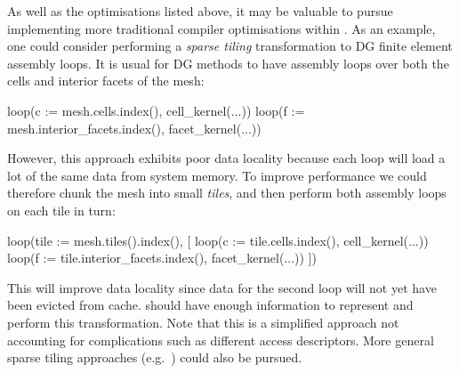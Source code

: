 \documentclass[thesis]{subfiles}
\begin{document}
As well as the optimisations listed above, it may be valuable to pursue implementing more traditional compiler optimisations within .
As an example, one could consider performing a \emph{sparse tiling} transformation to DG finite element assembly loops.
It is usual for DG methods to have assembly loops over both the cells and interior facets of the mesh:
\begin{pyinline}
  loop(c := mesh.cells.index(), cell_kernel(...))
  loop(f := mesh.interior_facets.index(), facet_kernel(...))
\end{pyinline}
However, this approach exhibits poor data locality because each loop will load a lot of the same data from system memory.
To improve performance we could therefore chunk the mesh into small \emph{tiles}, and then perform both assembly loops on each tile in turn:
\begin{pyinline}
  loop(tile := mesh.tiles().index(), [
    loop(c := tile.cells.index(), cell_kernel(...))
    loop(f := tile.interior_facets.index(), facet_kernel(...))
  ])
\end{pyinline}
This will improve data locality since data for the second loop will not yet have been evicted from cache.
 should have enough information to represent and perform this transformation.
Note that this is a simplified approach not accounting for complications such as different access descriptors.
More general sparse tiling approaches (e.g.~\cite{luporiniAutomatedTilingUnstructured2019}) could also be pursued.
\end{document}
